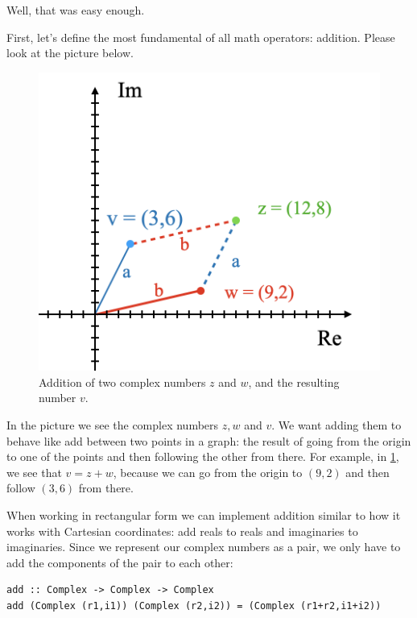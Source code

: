 Well, that was easy enough. 

First, let's define the most fundamental of all math operators: addition. Please look at the picture below.

\begin{figure}[h!]
    \centering
    \includegraphics[scale= 0.4]{Addition.png}
    \caption{Addition of two complex numbers $z$ and $w$, and the resulting number $v$.}
    \label{addition}
\end{figure}

In the picture we see the complex numbers $z, w$ and $v$. We want adding them to behave like add between two points in a graph: the result of going from the origin to one of the points and then following the other from there. For example, in \ref{addition}, we see that $v = z + w$, because we can go from the origin to $(9,2)$ and then follow $(3,6)$ from there. 

When working in rectangular form we can implement addition similar to how it works with Cartesian coordinates: add reals to reals and imaginaries to imaginaries. Since we represent our complex numbers as a pair, we only have to add the components of the pair to each other:
\begin{verbatim}
add :: Complex -> Complex -> Complex
add (Complex (r1,i1)) (Complex (r2,i2)) = (Complex (r1+r2,i1+i2))
\end{verbatim}

